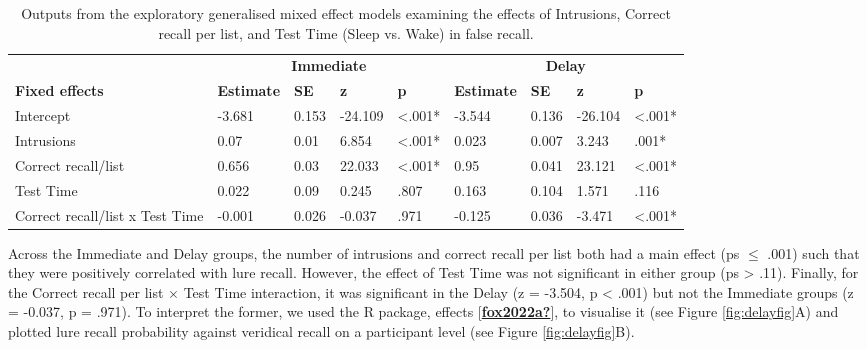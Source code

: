 \documentclass[
]{article}
\begin{document}
\begin{table}[H]

\caption{\label{tab:table7}Outputs from the exploratory generalised mixed effect models examining the effects of Intrusions, Correct recall per list, and Test Time (Sleep vs. Wake) in false recall.}
\centering
\begin{tabular}[t]{lllllllll}
\toprule
\multicolumn{1}{c}{\textbf{}} & \multicolumn{4}{c}{\textbf{Immediate}} & \multicolumn{4}{c}{\textbf{Delay}} \\
\cmidrule(l{3pt}r{3pt}){2-5} \cmidrule(l{3pt}r{3pt}){6-9}
\textbf{Fixed effects} & \textbf{Estimate} & \textbf{SE} & \textbf{z} & \textbf{p} & \textbf{Estimate} & \textbf{SE} & \textbf{z} & \textbf{p}\\
\midrule
Intercept & -3.681 & 0.153 & -24.109 & <.001* & -3.544 & 0.136 & -26.104 & <.001*\\
Intrusions & 0.07 & 0.01 & 6.854 & <.001* & 0.023 & 0.007 & 3.243 & .001*\\
Correct recall/list & 0.656 & 0.03 & 22.033 & <.001* & 0.95 & 0.041 & 23.121 & <.001*\\
Test Time & 0.022 & 0.09 & 0.245 & .807 & 0.163 & 0.104 & 1.571 & .116\\
Correct recall/list x Test Time & -0.001 & 0.026 & -0.037 & .971 & -0.125 & 0.036 & -3.471 & <.001*\\
\bottomrule
\end{tabular}
\end{table}

Across the Immediate and Delay groups, the number of intrusions and correct recall per list both had a main effect (ps \(\leq\) .001) such that they were positively correlated with lure recall. However, the effect of Test Time was not significant in either group (ps \textgreater{} .11). Finally, for the Correct recall per list \(\times\) Test Time interaction, it was significant in the Delay (z = -3.504, p \textless{} .001) but not the Immediate groups (z = -0.037, p = .971). To interpret the former, we used the R package, effects {[}\protect\hyperlink{ref-fox2022a}{\textbf{fox2022a?}}{]}, to visualise it (see Figure \ref{fig:delayfig}A) and plotted lure recall probability against veridical recall on a participant level (see Figure \ref{fig:delayfig}B).
\end{document}
